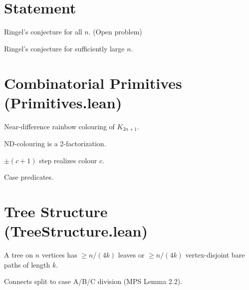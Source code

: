 \chapter{Statement}
\begin{definition}\label{def:ringel_conjecture}
Ringel's conjecture for all $n$. (Open problem)
\end{definition}

\begin{definition}\label{def:ringel_conjecture_large}
Ringel's conjecture for sufficiently large $n$.
\end{definition}

\chapter{Combinatorial Primitives (Primitives.lean)}
\begin{definition}\label{def:ndColouring}
\leanok
Near-difference rainbow colouring of $K_{2n+1}$.
\end{definition}

\begin{theorem}\label{thm:ndColouring_isTwoFactorization}
\leanok
ND-colouring is a 2-factorization.
\end{theorem}

\begin{lemma}\label{lem:ndColouring_step}
\leanok
$\pm(c+1)$ step realizes colour $c$.
\end{lemma}

\begin{definition}\label{def:case_predicates}
\leanok
Case predicates.
\end{definition}

\chapter{Tree Structure (TreeStructure.lean)}
\begin{theorem}\label{thm:split}
\leanok
A tree on $n$ vertices has $\geq n/(4k)$ leaves or $\geq n/(4k)$ vertex-disjoint bare paths of length $k$.
\end{theorem}

\begin{theorem}\label{thm:tree_split_via_split}
\leanok
Connects split to case A/B/C division (MPS Lemma 2.2).
\end{theorem}


